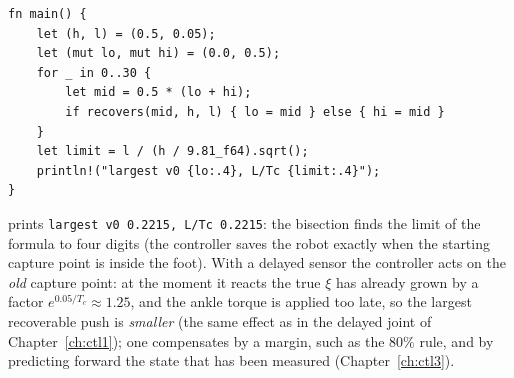 \begin{enumerate}[label=\textbf{\ansnum.\arabic*}]
\begin{verbatim}
fn main() {
    let (h, l) = (0.5, 0.05);
    let (mut lo, mut hi) = (0.0, 0.5);
    for _ in 0..30 {
        let mid = 0.5 * (lo + hi);
        if recovers(mid, h, l) { lo = mid } else { hi = mid }
    }
    let limit = l / (h / 9.81_f64).sqrt();
    println!("largest v0 {lo:.4}, L/Tc {limit:.4}");
}
\end{verbatim}
prints \verb!largest v0 0.2215, L/Tc 0.2215!: the bisection finds the limit of the formula to four digits (the controller saves the robot exactly when the starting capture point is inside the foot). With a delayed sensor the controller acts on the \emph{old} capture point: at the moment it reacts the true $\xi$ has already grown by a factor $e^{0.05/T_c}\approx1.25$, and the ankle torque is applied too late, so the largest recoverable push is \emph{smaller} (the same effect as in the delayed joint of Chapter~\ref{ch:ctl1}); one compensates by a margin, such as the $80\%$ rule, and by predicting forward the state that has been measured (Chapter~\ref{ch:ctl3}).
\end{enumerate}
